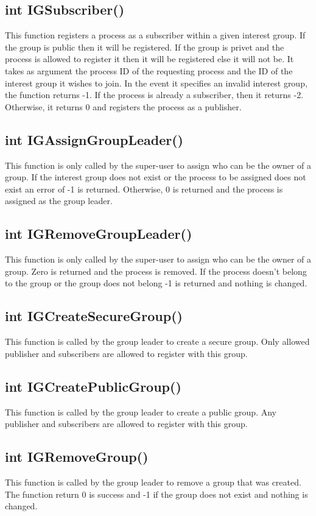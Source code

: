 \documentclass{article}
\begin{document}
\subsection{int IGSubscriber()}
This function registers a process as a subscriber within a given interest group. If the group is public then it will be registered. If the group is privet and the process is allowed to register it then it will be registered else it will not be. It takes as argument the process ID of the requesting process and the ID of the interest group it wishes to join.  In the event it specifies an invalid interest group, the function returns -1.  If the process is already a subscriber, then it returns -2.  Otherwise, it returns 0 and registers the process as a publisher.

\subsection{int IGAssignGroupLeader()}
This function is only called by the super-user to assign who can be the owner of a group. If the interest group does not exist or the process to be assigned does not exist an error of -1 is returned. Otherwise, 0 is returned and the process is assigned as the group leader. 

\subsection{int IGRemoveGroupLeader()}
This function is only called by the super-user to assign who can be the owner of a group. Zero is returned and the process is removed. If the process doesn't belong to the group or the group does not belong -1 is returned and nothing is changed.  


\subsection{int IGCreateSecureGroup()}
This function is called by the group leader to create a secure group. Only allowed publisher and subscribers are allowed to register with this group. 

\subsection{int IGCreatePublicGroup()}
This function is called by the group leader to create a public group. Any publisher and subscribers are allowed to register with this group. 

\subsection{int IGRemoveGroup()}
This function is called by the group leader to remove a group that was created. The function return 0 is success and -1 if the group does not exist and nothing is changed.
\end{document}
